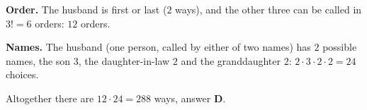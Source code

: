 \textbf{Order.} The husband is first or last ($2$ ways), and the other three can be called in $3!=6$ orders: $12$ orders.

\textbf{Names.} The husband (one person, called by either of two names) has $2$ possible names, the son $3$, the daughter-in-law $2$ and the granddaughter $2$: $2\cdot3\cdot2\cdot2=24$ choices.

Altogether there are $12\cdot24=\boxed{288}$ ways, answer $\textbf{D}$.
